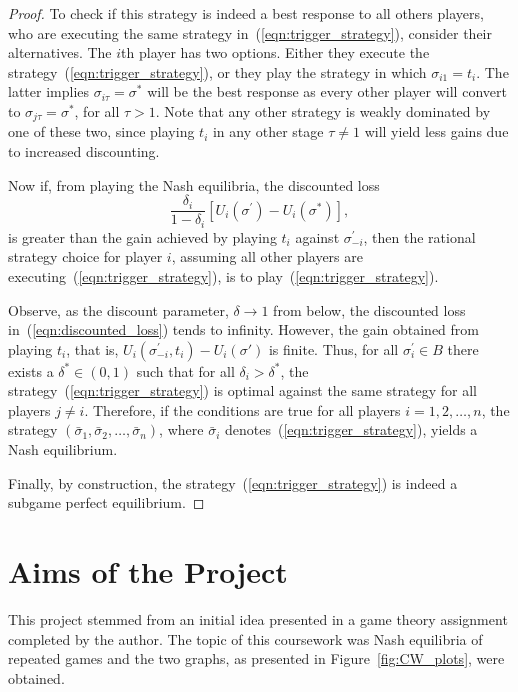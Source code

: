 \begin{proof}
    To check if this strategy is indeed a best response to all others players,
    who are executing the same strategy in~(\ref{eqn:trigger_strategy}),
    consider their alternatives. The \(i\)th player has two options. Either
    they execute the strategy~(\ref{eqn:trigger_strategy}), or they play the
    strategy in which \(\sigma_{i1} = t_{i}\). The latter implies \(\sigma_{i\tau} =
    \sigma^{*}\) will be the best response as every other player will convert
    to \(\sigma_{j\tau} = \sigma^{*}\), for all \(\tau > 1\). Note that any
    other strategy is weakly dominated by one of these two, since playing
    \(t_{i}\) in any other stage \(\tau \ne 1\) will yield less gains due to increased discounting.

    Now if, from playing the Nash equilibria, the discounted loss 
    \begin{equation}\label{eqn:discounted_loss}
        \frac{\delta_{i}}{1-\delta_{i}}[U_{i}(\sigma^{\prime}) -
        U_{i}(\sigma^{*})],
    \end{equation}
    is greater than the gain achieved by playing
    \(t_{i}\) against \(\sigma_{-i}^{\prime}\), then the rational
    strategy choice for player \(i\), assuming all other players are
    executing~(\ref{eqn:trigger_strategy}), is to play~(\ref{eqn:trigger_strategy}).
    
    Observe, as the discount parameter, \(\delta \to 1\) from
    below, the discounted loss in~(\ref{eqn:discounted_loss}) tends to infinity.
    However, the gain obtained from playing \(t_{i}\), that is,
    \(U_{i}(\sigma_{-i}^{\prime}, t_{i}) - U_{i}(\sigma{\prime})\) is finite.
    Thus, for all \(\sigma_{i}^{\prime} \in B\) there exists a \(\delta^{*} \in
    (0, 1)\) such that for all \(\delta_{i} > \delta^{*}\), the
    strategy~(\ref{eqn:trigger_strategy}) is optimal against the same strategy
    for all players \(j \ne i\). Therefore, if the conditions are true for all
    players \(i = 1,2,\ldots,n\), the strategy \((\bar{\sigma}_{1},
    \bar{\sigma}_{2}, \ldots, \bar{\sigma}_{n})\), where  \(\bar{\sigma}_{i}\)
    denotes~(\ref{eqn:trigger_strategy}), yields a Nash equilibrium.

    Finally, by construction, the strategy~(\ref{eqn:trigger_strategy}) is
    indeed a subgame perfect equilibrium. 
\end{proof}


\section{Aims of the Project}\label{sec:Aims_of_the_Project}
This project stemmed from an initial idea presented in a game theory assignment
completed by the author. The topic of this coursework was Nash equilibria of
repeated games and the two graphs, as presented in Figure~\ref{fig:CW_plots}, were
obtained.

